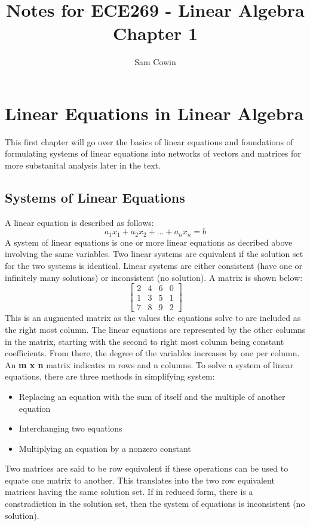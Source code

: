 \documentclass[12pt]{article}
\begin{document}
\title{Notes for ECE269 - Linear Algebra \\
\large Chapter 1}
\author{Sam Cowin}

\maketitle

\section{Linear Equations in Linear Algebra}
This first chapter will go over the basics of linear equations and foundations of formulating systems of linear equations %
into networks of vectors and matrices for more substanital analysis later in the text.

\subsection{Systems of Linear Equations}
A linear equation is described as follows:
\begin{equation}
    a_1x_1 + a_2x_2 + \dots + a_nx_n = b
\end{equation}
A system of linear equations is one or more linear equations as decribed above involving the same variables. %
Two linear systems are equivalent if the solution set for the two systems is identical. Linear systems are either %
consistent (have one or infinitely many solutions) or inconsistent (no solution).
\newline
\newline
\noindent A matrix is shown below:
$$
\begin{bmatrix}
    2 & 4 & 6 & 0 \\
    1 & 3 & 5 & 1 \\
    7 & 8 & 9 & 2
\end{bmatrix}
$$
\newline
This is an augmented matrix as the values the equations solve to are included as the right most column. The linear equations are represented%
 by the other columns in the matrix, starting with the second to right most column being constant coefficients. From there, the degree of the variables%
 increases by one per column. An \textbf{m x n} matrix indicates m rows and n columns. 
\newline
\newline
To solve a system of linear equations, there are three methods in simplifying system:
\begin{itemize}
    \item Replacing an equation with the sum of itself and the multiple of another equation
    \item Interchanging two equations
    \item Multiplying an equation by a nonzero constant
\end{itemize}
Two matrices are said to be row equivalent if these operations can be used to equate one matrix to another. This translates into the two row equivalent matrices %
having the same solution set. If in reduced form, there is a constradiction in the solution set, then the system of equations is inconsistent (no solution). 
\newline
\newline
\end{document}
